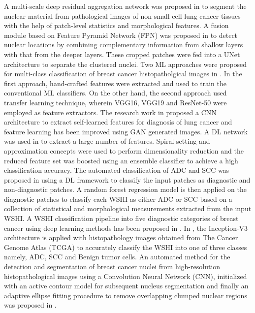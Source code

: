 \documentclass{comjnl}
\begin{document}
A multi-scale deep residual aggregation network was proposed in \cite{quoc} to segment the nuclear material from pathological images of non-small cell lung cancer tissues with the help of patch-level statistics and morphological features. A fusion module based on Feature Pyramid Network (FPN) was proposed in \cite{zhiming} to detect nuclear locations by combining complementary information from shallow layers with that from the deeper layers. These cropped patches were fed into a UNet architecture to separate the clustered nuclei. Two ML approaches were proposed for multi-class classification of breast cancer histopatholgical images in \cite{sharma}. In the first approach, hand-crafted features were extracted and used to train the conventional ML classifiers. On the other hand, the second approach used transfer learning technique, wherein VGG16, VGG19 \cite{simonyan} and ResNet-50 were employed as feature extractors. The research work in \cite{suresh} proposed a CNN architecture to extract self-learned features for diagnosis of lung cancer and feature learning has been improved using GAN generated images. A DL network was used in \cite{shakeel} to extract a large number of features. Spiral setting and approximation concepts were used to perform dimensionality reduction and the reduced feature set was boosted using an ensemble classifier to achieve a high classification accuracy. The automated classification of ADC and SCC was proposed in \cite{simon} using a DL framework to classify the input patches as diagnostic and non-diagnostic patches. A random forest regression model is then applied on the diagnostic patches to classify each WSHI as either ADC or SCC based on a collection of statistical and morphological measurements extracted from the input WSHI. A WSHI classification pipeline into five diagnostic categories of breast cancer using deep learning methods has been proposed in \cite{baris}. In \cite{coudray2018classification}, the Inception-V3 architecture \cite{szegedy} is applied with histopathology images obtained from The Cancer Genome Atlas (TCGA) to accurately classify the WSHI into one of three classes namely, ADC, SCC and Benign tumor cells. 
An automated method for the detection and segmentation of breast cancer nuclei from high-resolution histopathological images using a Convolution Neural Network (CNN), initialized with an active contour model for subsequent nucleus segmentation and finally an adaptive ellipse fitting procedure to remove overlapping clumped nuclear regions was proposed in \cite{jun}. 
\end{document}
